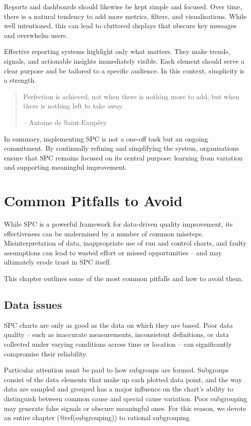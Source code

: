 \documentclass[
]{book}
\begin{document}
Reports and dashboards should likewise be kept simple and focused. Over
time, there is a natural tendency to add more metrics, filters, and
visualisations. While well intentioned, this can lead to cluttered
displays that obscure key messages and overwhelm users.

Effective reporting systems highlight only what matters. They make
trends, signals, and actionable insights immediately visible. Each
element should serve a clear purpose and be tailored to a specific
audience. In this context, simplicity is a strength.

\begin{quote}
Perfection is achieved, not when there is nothing more to add, but when
there is nothing left to take away.

-- Antoine de Saint-Exupéry
\end{quote}

In summary, implementing SPC is not a one-off task but an ongoing
commitment. By continually refining and simplifying the system,
organisations ensure that SPC remains focused on its central purpose:
learning from variation and supporting meaningful improvement.

\chapter{Common Pitfalls to Avoid}\label{pitfalls}

While SPC is a powerful framework for data-driven quality improvement,
its effectiveness can be undermined by a number of common missteps.
Misinterpretation of data, inappropriate use of run and control charts,
and faulty assumptions can lead to wasted effort or missed opportunities
-- and may ultimately erode trust in SPC itself.

This chapter outlines some of the most common pitfalls and how to avoid
them.

\section{Data issues}\label{data-issues}

SPC charts are only as good as the data on which they are based. Poor
data quality -- such as inaccurate measurements, inconsistent
definitions, or data collected under varying conditions across time or
location -- can significantly compromise their reliability.

Particular attention must be paid to how subgroups are formed. Subgroups
consist of the data elements that make up each plotted data point, and
the way data are sampled and grouped has a major influence on the
chart's ability to distinguish between common cause and special cause
variation. Poor subgrouping may generate false signals or obscure
meaningful ones. For this reason, we devote an entire chapter
(@ref(subgrouping)) to rational subgrouping.
\end{document}
